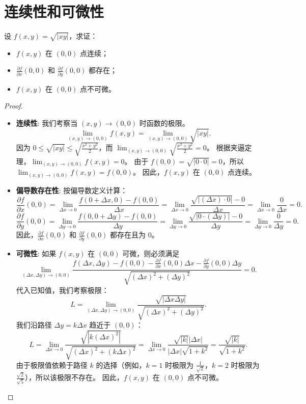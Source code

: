 \documentclass[lang=cn,10pt,thmcnt=section]{elegantbook}
\begin{document}
\section{连续性和可微性}
\begin{example}
    设 $f(x, y) = \sqrt{|xy|}$，求证：
\begin{itemize}
\item $f(x, y)$ 在 $(0, 0)$ 点连续；
\item $\frac{\partial f}{\partial x}(0, 0)$ 和 $\frac{\partial f}{\partial y}(0, 0)$ 都存在；
\item $f(x, y)$ 在 $(0, 0)$ 点不可微。
\end{itemize}
\end{example}
\begin{proof}
\begin{itemize}
    \item \textbf{连续性}:
    我们考察当 $(x, y) \to (0, 0)$ 时函数的极限。
    \[
    \lim_{(x,y) \to (0,0)} f(x, y) = \lim_{(x,y) \to (0,0)} \sqrt{|xy|}.
    \]
    因为 $0 \le \sqrt{|xy|} \le \sqrt{\frac{x^2+y^2}{2}}$，而 $\lim_{(x,y)\to(0,0)} \sqrt{\frac{x^2+y^2}{2}} = 0$。
    根据夹逼定理，$\lim_{(x,y) \to (0,0)} f(x, y) = 0$。
    由于 $f(0, 0) = \sqrt{|0 \cdot 0|} = 0$，所以 $\lim_{(x,y) \to (0,0)} f(x, y) = f(0, 0)$。
    因此，$f(x, y)$ 在 $(0, 0)$ 点连续。

    \item \textbf{偏导数存在性}:
    按偏导数定义计算：
    \[
    \frac{\partial f}{\partial x}(0, 0) = \lim_{\Delta x \to 0} \frac{f(0+\Delta x, 0) - f(0, 0)}{\Delta x} = \lim_{\Delta x \to 0} \frac{\sqrt{|(\Delta x) \cdot 0|} - 0}{\Delta x} = \lim_{\Delta x \to 0} \frac{0}{\Delta x} = 0.
    \]
    \[
    \frac{\partial f}{\partial y}(0, 0) = \lim_{\Delta y \to 0} \frac{f(0, 0+\Delta y) - f(0, 0)}{\Delta y} = \lim_{\Delta y \to 0} \frac{\sqrt{|0 \cdot (\Delta y)|} - 0}{\Delta y} = \lim_{\Delta y \to 0} \frac{0}{\Delta y} = 0.
    \]
    因此，$\frac{\partial f}{\partial x}(0, 0)$ 和 $\frac{\partial f}{\partial y}(0, 0)$ 都存在且为 $0$。

    \item \textbf{可微性}:
    如果 $f(x, y)$ 在 $(0, 0)$ 可微，则必须满足
    \[
    \lim_{(\Delta x, \Delta y) \to (0, 0)} \frac{f(\Delta x, \Delta y) - f(0, 0) - \frac{\partial f}{\partial x}(0, 0)\Delta x - \frac{\partial f}{\partial y}(0, 0)\Delta y}{\sqrt{(\Delta x)^2 + (\Delta y)^2}} = 0.
    \]
    代入已知值，我们考察极限：
    \[
    L = \lim_{(\Delta x, \Delta y) \to (0, 0)} \frac{\sqrt{|\Delta x \Delta y|}}{\sqrt{(\Delta x)^2 + (\Delta y)^2}}.
    \]
    我们沿路径 $\Delta y = k \Delta x$ 趋近于 $(0, 0)$：
    \[
    L = \lim_{\Delta x \to 0} \frac{\sqrt{|k(\Delta x)^2|}}{\sqrt{(\Delta x)^2 + (k\Delta x)^2}} = \lim_{\Delta x \to 0} \frac{\sqrt{|k|}|\Delta x|}{|\Delta x|\sqrt{1+k^2}} = \frac{\sqrt{|k|}}{\sqrt{1+k^2}}.
    \]
    由于极限值依赖于路径 $k$ 的选择（例如，$k=1$ 时极限为 $\frac{1}{\sqrt{2}}$，$k=2$ 时极限为 $\frac{\sqrt{2}}{\sqrt{5}}$），所以该极限不存在。
    因此，$f(x, y)$ 在 $(0, 0)$ 点不可微。
\end{itemize}
\end{proof}
\end{document}
